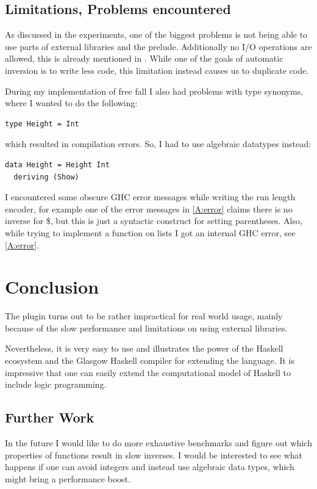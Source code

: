 \documentclass[12pt,a4paper, dvipsnames,usenames]{article}
\begin{document}
\subsection{Limitations, Problems encountered}

As discussed in the experiments, one of the biggest
problems is not being able to use parts of external
libraries and the prelude. Additionally no I/O operations are allowed, this
is already mentioned in \cite{teegen2021haskell}.
While one of the goals of automatic inversion is to write less code, this limitation
instead causes us to duplicate code.

During my implementation of free fall I also had problems with
type synonyms, where I wanted to do the following:
\begin{verbatim}
type Height = Int
\end{verbatim}
which resulted in compilation errors.
So, I had to use algebraic datatypes instead:
\begin{verbatim}
data Height = Height Int
  deriving (Show)
\end{verbatim}

I encountered some obscure GHC error messages
while writing the run length encoder, for example
one of the error messages in \cref{A:error} claims there
is no inverse for \$, but this is just a syntactic construct
for setting parentheses.
Also, while trying to implement a function on lists I got
an internal GHC error, see \cref{A:error}.


\section{Conclusion}

The plugin turns out to be rather impractical for real world usage,
mainly because of the slow performance and limitations on using external
libraries.

Nevertheless, it is very easy to use and illustrates the power of
the Haskell ecosystem and the Glasgow Haskell compiler for extending
the language. It is impressive that one can easily extend
the computational model of Haskell to include logic programming.

\subsection{Further Work}

In the future I would like to do more exhaustive benchmarks and figure
out which properties of functions result in slow inverses.
I would be interested to see what happens if one can avoid integers
and instead use algebraic data types, which might bring a performance boost.
\end{document}
